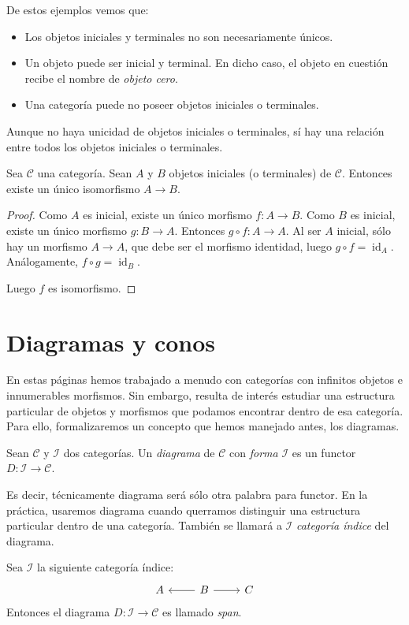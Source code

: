 \documentclass[12pt, twoside]{book}
\newcommand{\newterm}[1]{\index{#1}\emph{#1}}
\newcommand{\cat}{{\mathcal{C}}}
\DeclareMathOperator{\id}{id}
\begin{document}
De estos ejemplos vemos que:
\begin{itemize}
  \item Los objetos iniciales y terminales no son necesariamente únicos.
  \item Un objeto puede ser inicial y terminal.
  En dicho caso, el objeto en cuestión recibe el nombre de \emph{objeto cero}.
  \item Una categoría puede no poseer objetos iniciales o terminales.
\end{itemize}

Aunque no haya unicidad de objetos iniciales o terminales, sí hay una relación entre todos los objetos iniciales o terminales.
\begin{proposition}
Sea $\cat$ una categoría. Sean $A$ y $B$ objetos iniciales (o terminales) de $\cat$.
Entonces existe un único isomorfismo $A \to B$.
\end{proposition}
\begin{proof}
Como $A$ es inicial, existe un único morfismo $f \colon A \to B$.
Como $B$ es inicial, existe un único morfismo $g \colon B \to A$.
Entonces $g \circ f \colon A \to A$.
Al ser $A$ inicial, sólo hay un morfismo $A \to A$, que debe ser el morfismo identidad, luego $g \circ f = \id_A$.
Análogamente, $f \circ g = \id_B$.

Luego $f$ es isomorfismo.
\end{proof}

\section{Diagramas y conos}
En estas páginas hemos trabajado a menudo con categorías con infinitos objetos e innumerables morfismos.
Sin embargo, resulta de interés estudiar una estructura particular de objetos y morfismos que podamos encontrar dentro de esa categoría.
Para ello, formalizaremos un concepto que hemos manejado antes, los diagramas.
\begin{definition}
Sean $\cat$ y $\mathcal{I}$ dos categorías. Un \newterm{diagrama} de $\cat$ con \emph{forma} $\mathcal{I}$ es un functor $D \colon \mathcal{I} \to \cat$.
\end{definition}
Es decir, técnicamente diagrama será sólo otra palabra para functor.
En la práctica, usaremos diagrama cuando querramos distinguir una estructura particular dentro de una categoría.
También se llamará a $\mathcal{I}$ \emph{categoría índice} del diagrama.

\begin{example}\label{ejemplo-span}
Sea $\mathcal{I}$ la siguiente categoría índice:
\[ \begin{tikzcd}
A & B \arrow[l] \arrow[r] & C
\end{tikzcd} \]
Entonces el diagrama $D \colon \mathcal{I} \to \cat$ es llamado \newterm{span}.
\end{example}
\end{document}
